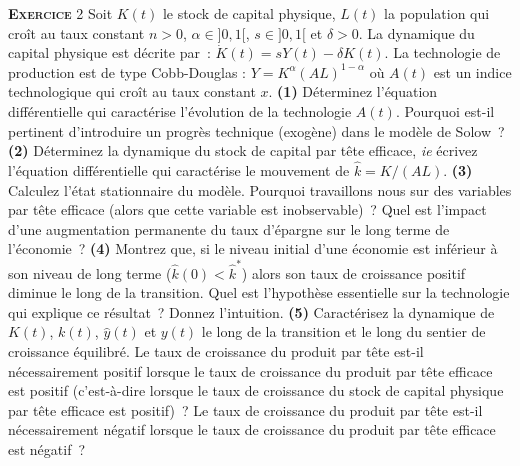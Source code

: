 \documentclass[10pt,a4paper,notitlepage]{article}
\newcommand{\exercice}[1]{\textsc{\textbf{Exercice}} #1}
\newcommand{\question}[1]{\textbf{(#1)}}
\begin{document}
\exercice{2}  Soit $K(t)$  le  stock de  capital  physique, $L(t)$  la
population qui  croît au taux  constant $n>0$, $\alpha \in  ]0,1[$, $s
\in ]0,1[$ et $\delta>0$. La dynamique du capital physique est décrite
par :  $\dot{K}(t)=sY(t)-\delta K(t)$.   La technologie  de production
est de type  Cobb-Douglas : $Y =  K^{\alpha}(AL)^{1-\alpha}$ où $A(t)$
est   un   indice   technologique   qui   croît   au   taux   constant
$x$. \question{1} Déterminez l'équation différentielle qui caractérise
l'évolution  de  la  technologie  $A(t)$.  Pourquoi  est-il  pertinent
d'introduire un progrès technique (exogène)  dans le modèle de Solow ?
\question{2}  Déterminez la  dynamique du  stock de  capital par  tête
efficace,   \textit{ie}   écrivez    l'équation   différentielle   qui
caractérise  le mouvement  de $\hat{k}=K/(AL)$.  \question{3} Calculez
l'état  stationnaire  du modèle.  Pourquoi  travaillons  nous sur  des
variables   par  tête   efficace   (alors  que   cette  variable   est
inobservable) ?  Quel  est l'impact  d'une augmentation  permanente du
taux d'épargne sur le long  terme de l'économie ? \question{4} Montrez
que, si le niveau initial d'une économie est inférieur à son niveau de
long  terme  ($\hat{k}(0)<\hat{k}^*$)  alors son  taux  de  croissance
positif  diminue  le  long  de la  transition.  Quel  est  l'hypothèse
essentielle  sur  la technologie  qui  explique  ce résultat ?  Donnez
l'intuition.   \question{5}  Caractérisez   la  dynamique  de  $K(t)$,
$k(t)$, $\hat y(t)$ et  $y(t)$ le long de la transition  et le long du
sentier de croissance équilibré. Le  taux de croissance du produit par
tête est-il  nécessairement positif lorsque  le taux de  croissance du
produit par tête efficace est positif (c'est-à-dire lorsque le taux de
croissance  du  stock  de  capital  physique  par  tête  efficace  est
positif) ?  Le  taux   de  croissance  du  produit   par  tête  est-il
nécessairement négatif  lorsque le taux  de croissance du  produit par
tête efficace est négatif ?\newline
\end{document}
